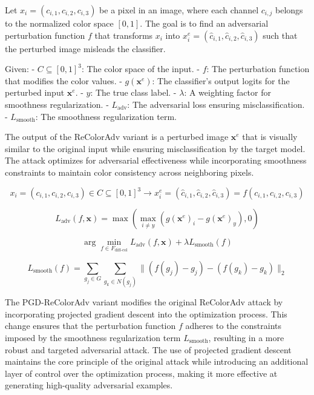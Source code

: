 Let $x_i = (c_{i,1}, c_{i,2}, c_{i,3})$ be a pixel in an image, where each channel $c_{i,j}$ belongs to the normalized color space $[0,1]$. The goal is to find an adversarial perturbation function $f$ that transforms $x_i$ into $x_i^e = (\hat{c}_{i,1}, \hat{c}_{i,2}, \hat{c}_{i,3})$ such that the perturbed image misleads the classifier.

Given:
- $C \subseteq [0,1]^3$: The color space of the input.
- $f$: The perturbation function that modifies the color values.
- $g(\mathbf{x}^e)$: The classifier's output logits for the perturbed input $\mathbf{x}^e$.
- $y$: The true class label.
- $\lambda$: A weighting factor for smoothness regularization.
- $L_{\text{adv}}$: The adversarial loss ensuring misclassification.
- $L_{\text{smooth}}$: The smoothness regularization term.

The output of the ReColorAdv variant is a perturbed image $\mathbf{x}^e$ that is visually similar to the original input while ensuring misclassification by the target model. The attack optimizes for adversarial effectiveness while incorporating smoothness constraints to maintain color consistency across neighboring pixels.



\begin{equation}
x_i = (c_{i,1}, c_{i,2}, c_{i,3}) \in C \subseteq [0, 1]^3 \rightarrow x_i^e = (\hat{c}_{i,1}, \hat{c}_{i,2}, \hat{c}_{i,3}) = f(c_{i,1}, c_{i,2}, c_{i,3})
\end{equation}

\begin{equation}
L_{\text{adv}}(f, \mathbf{x}) = \max \left( \max_{i \neq y} (g(\mathbf{x}^e)_i - g(\mathbf{x}^e)_y), 0 \right)
\end{equation}

\begin{equation}
\arg\min_{f \in F_{\text{diff-col}}} L_{\text{adv}}(f, \mathbf{x}) + \lambda L_{\text{smooth}}(f)
\end{equation}

\begin{equation}
L_{\text{smooth}}(f) = \sum_{g_j \in G} \sum_{g_k \in N(g_j)} \| (f(g_j) - g_j) - (f(g_k) - g_k) \|_2
\end{equation}

The PGD-ReColorAdv variant modifies the original ReColorAdv attack by incorporating projected gradient descent into the optimization process. This change ensures that the perturbation function $f$ adheres to the constraints imposed by the smoothness regularization term $L_{\text{smooth}}$, resulting in a more robust and targeted adversarial attack. The use of projected gradient descent maintains the core principle of the original attack while introducing an additional layer of control over the optimization process, making it more effective at generating high-quality adversarial examples.